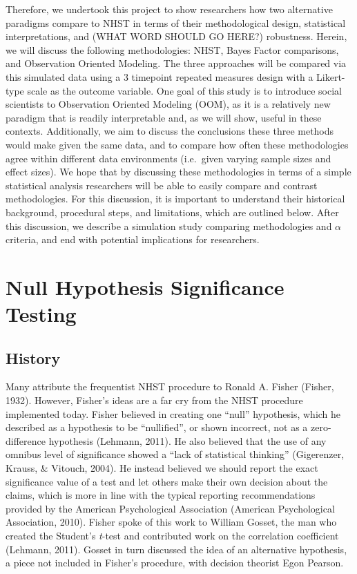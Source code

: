 \documentclass[english,man]{apa6}
\theoremstyle{definition}
\theoremstyle{definition}
\theoremstyle{definition}
\theoremstyle{remark}
\begin{document}
Therefore, we undertook this project to show researchers how two
alternative paradigms compare to NHST in terms of their methodological
design, statistical interpretations, and (WHAT WORD SHOULD GO HERE?)
robustness. Herein, we will discuss the following methodologies: NHST,
Bayes Factor comparisons, and Observation Oriented Modeling. The three
approaches will be compared via this simulated data using a 3 timepoint
repeated measures design with a Likert-type scale as the outcome
variable. One goal of this study is to introduce social scientists to
Observation Oriented Modeling (OOM), as it is a relatively new paradigm
that is readily interpretable and, as we will show, useful in these
contexts. Additionally, we aim to discuss the conclusions these three
methods would make given the same data, and to compare how often these
methodologies agree within different data environments (i.e.~given
varying sample sizes and effect sizes). We hope that by discussing these
methodologies in terms of a simple statistical analysis researchers will
be able to easily compare and contrast methodologies. For this
discussion, it is important to understand their historical background,
procedural steps, and limitations, which are outlined below. After this
discussion, we describe a simulation study comparing methodologies and
\(\alpha\) criteria, and end with potential implications for
researchers.

\section{Null Hypothesis Significance
Testing}\label{null-hypothesis-significance-testing}

\subsection{History}\label{history}

Many attribute the frequentist NHST procedure to Ronald A. Fisher
(Fisher, 1932). However, Fisher's ideas are a far cry from the NHST
procedure implemented today. Fisher believed in creating one
\enquote{null} hypothesis, which he described as a hypothesis to be
\enquote{nullified}, or shown incorrect, not as a zero-difference
hypothesis (Lehmann, 2011). He also believed that the use of any omnibus
level of significance showed a \enquote{lack of statistical thinking}
(Gigerenzer, Krauss, \& Vitouch, 2004). He instead believed we should
report the exact significance value of a test and let others make their
own decision about the claims, which is more in line with the typical
reporting recommendations provided by the American Psychological
Association (American Psychological Association, 2010). Fisher spoke of
this work to William Gosset, the man who created the Student's
\emph{t}-test and contributed work on the correlation coefficient
(Lehmann, 2011). Gosset in turn discussed the idea of an alternative
hypothesis, a piece not included in Fisher's procedure, with decision
theorist Egon Pearson.
\end{document}
